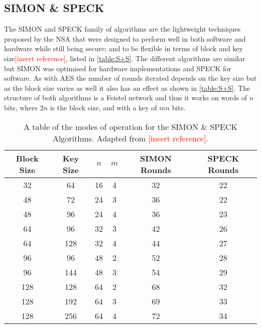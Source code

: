 \documentclass[12pt,twoside,a4paper]{report}
\begin{document}
    \subsection{SIMON \& SPECK}
    The SIMON and SPECK family of algorithms are the lightweight techniques proposed by the NSA that were designed to perform well in both software and hardware while still being secure; and to be flexible in terms of block and key size\textcolor{red}{[insert reference]}, listed in \autoref{table:S+S}.
    The different algorithms are similar but SIMON was optimised for hardware implementations and SPECK for software.
    As with AES the number of rounds iterated depends on the key size but as the block size varies as well it also has an effect as shown in \autoref{table:S+S}.
    The structure of both algorithms is a Feistel network and thus it works on words of $n$ bits, where $2n$ is the block size, and with a key of $mn$ bits.
    
        \begin{table}[H]
        \centering
        \begin{tabular}{||c|c|c|c|c|c||}
            \hline \hline
            Block Size & Key Size & $n$ & $m$ & SIMON Rounds & SPECK Rounds \\
            \hline \hline
            32 & 64 & 16 & 4 & 32 & 22 \\
            \hline
            48 & 72 & 24 & 3 & 36 & 22 \\
            48 & 96 & 24 & 4 & 36 & 23 \\
            \hline
            64 & 96 & 32 & 3 & 42 & 26 \\
            64 & 128 & 32 & 4 & 44 & 27 \\
            \hline
            96 & 96 & 48 & 2 & 52 & 28 \\
            96 & 144 & 48 & 3 & 54 & 29 \\
            \hline
            128 & 128 & 64 & 2 & 68 & 32 \\
            128 & 192 & 64 & 3 & 69 & 33 \\
            128 & 256 & 64 & 4 & 72 & 34 \\
            \hline \hline
        \end{tabular}
        \caption{A table of the modes of operation for the SIMON \& SPECK Algorithms. Adapted from \textcolor{red}{[insert reference]}.}
        \label{table:S+S}
        \end{table}
    
\end{document}
